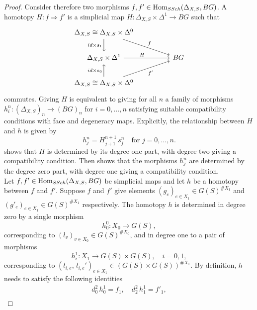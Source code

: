 \begin{proof}
Consider therefore two morphisms $f, f' \in \operatorname{Hom}_{SSch}(\Delta_{X,S}, BG)$. A homotopy $H \colon f \Rightarrow f'$ is a simplicial map $H \colon \Delta_{X,S} \times \Delta^1 \to BG$ such that
\begin{equation}
\begin{tikzcd}
	{\Delta_{X,S} \cong \Delta_{X,S} \times \Delta^0} \\
	{\Delta_{X,S} \times \Delta^1} && BG \\
	{\Delta_{X,S} \cong \Delta_{X,S} \times \Delta^0}
	\arrow["{id \times s_1}"', from=1-1, to=2-1]
	\arrow["f", from=1-1, to=2-3]
	\arrow["H"{pos=0.4}, from=2-1, to=2-3]
	\arrow["{id \times s_0}", from=3-1, to=2-1]
	\arrow["{f'}"', from=3-1, to=2-3]
\end{tikzcd}
\end{equation}
commutes. Giving $H$ is equivalent to giving for all $n$ a family of morphisms $h^n_i \colon (\Delta_{X,S})_n \to (BG)_n$ for $i = 0, \dots, n$ satisfying suitable compatibility conditions with face and degeneracy maps. Explicitly, the relationship between $H$ and $h$ is given by
\begin{equation} \label{eq: homotopy}
h^n_j = H^{n+1}_{j+1} \, s^n_j \quad \text{for } j=0,\dots, n.
\end{equation}
 shows that $H$ is determined by its degree one part, with degree two giving a compatibility condition. Then  shows that the morphisms $h^n_j$ are determined by the degree zero part, with degree one giving a compatibility condition.\\
Let $f, f' \in \operatorname{Hom}_{SSch}(\Delta_{X, S}, BG)$ be simplicial maps and let $h$ be a homotopy between $f$ and $f'$. Suppose $f$ and $f'$ give elements $(g_e)_{e \in X_1} \in G(S)^{\# X_1}$ and $(g'_e)_{e \in X_1} \in G(S)^{\# X_1}$ respectively. The homotopy $h$ is determined in degree zero by a single morphism
\begin{equation}
h^0_0 \colon  X_0 \to G(S),
\end{equation}
corresponding to $(l_v)_{v \in X_0} \in G(S)^{\# X_0}$, and in degree one to a pair of morphisms
\begin{equation}
h_i^1 \colon X_1 \to G(S) \times G(S), \quad i=0,1,
\end{equation}
corresponding to $(l_{i,e}, \, l_{i,e}' )_{e \in X_1} \in (G(S) \times G(S))^{\# X_1}$. By definition, $h$ needs to satisfy the following identities
\begin{gather}
d_0^2 \, h_0^1 = f_1, \quad d_2^2 \, h_1^1 = f'_1,\\

\end{gather}
\end{proof}
